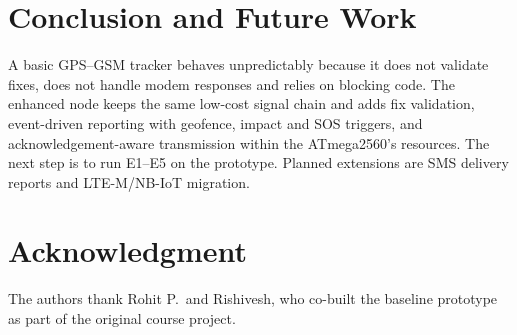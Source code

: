 \documentclass[conference]{IEEEtran}
\begin{document}
\section{Conclusion and Future Work}
A basic GPS--GSM tracker behaves unpredictably because it does not validate fixes, does not handle modem responses and relies on blocking code. The enhanced node keeps the same low-cost signal chain and adds fix validation, event-driven reporting with geofence, impact and SOS triggers, and acknowledgement-aware transmission within the ATmega2560's resources. The next step is to run E1--E5 on the prototype. Planned extensions are SMS delivery reports and LTE-M/NB-IoT migration.

\section*{Acknowledgment}
The authors thank Rohit P.\ and Rishivesh, who co-built the baseline prototype as part of the original course project.
\end{document}
